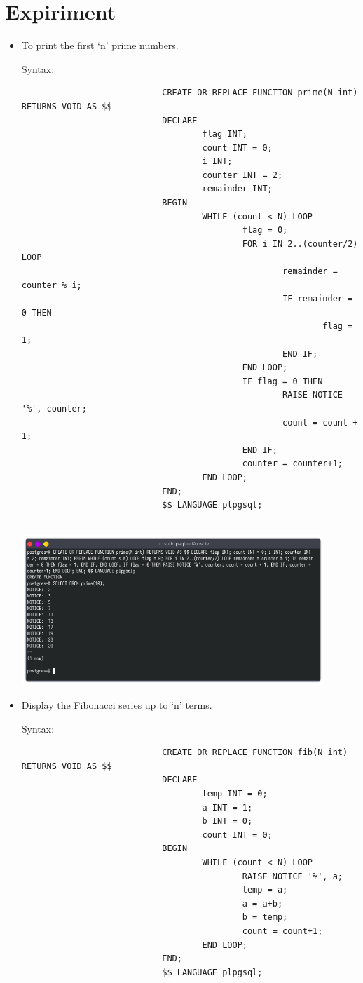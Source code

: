 \documentclass[13pt,oneside]{book}
\begin{document}
							\section*{Expiriment}
							\begin{itemize}
							\item
							To print the first `n' prime numbers.
							 
							 
							Syntax:
							\begin{verbatim}
							CREATE OR REPLACE FUNCTION prime(N int) RETURNS VOID AS $$
							DECLARE
									flag INT;
									count INT = 0;
									i INT;
									counter INT = 2;
									remainder INT;
							BEGIN
									WHILE (count < N) LOOP
											flag = 0;
											FOR i IN 2..(counter/2) LOOP
													remainder = counter % i;
													IF remainder = 0 THEN
															flag = 1;
													END IF;
											END LOOP;
											IF flag = 0 THEN
													RAISE NOTICE '%', counter;
													count = count + 1;
											END IF;
											counter = counter+1;
									END LOOP;
							END;
							$$ LANGUAGE plpgsql;
							
							\end{verbatim}
							\includegraphics[width=0.9\textwidth]{img/p8/ss1.png}
							
							
							\item
							Display the Fibonacci series up to `n' terms.
							 
							 
							Syntax:
							\begin{verbatim}
							CREATE OR REPLACE FUNCTION fib(N int) RETURNS VOID AS $$ 
							DECLARE
									temp INT = 0;
									a INT = 1;
									b INT = 0;
									count INT = 0;
							BEGIN
									WHILE (count < N) LOOP
											RAISE NOTICE '%', a;
											temp = a;
											a = a+b;
											b = temp;
											count = count+1;
									END LOOP;
							END;
							$$ LANGUAGE plpgsql;
							

\end{verbatim}
\end{itemize}
\end{document}
